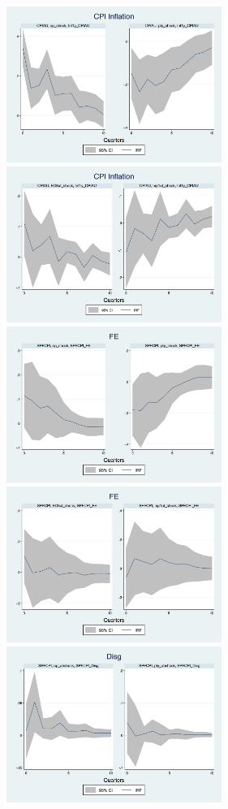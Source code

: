 \documentclass[]{article}
\begin{document}
\begin{figure}[ht]
	\centering
	\includegraphics[width=7cm,totalheight=3cm]{figures/CPIAU_ashocks_nmp_before2007.png}  
	\includegraphics[width=7cm,totalheight=3cm]{figures/CPIAU_ashocks_before2007.png} \\
	\smallskip
	\includegraphics[width=7cm,totalheight=3cm]{figures/SPFFE_ashocks_nmp_before2007.png} 
		\includegraphics[width=7cm,totalheight=3cm]{figures/SPFFE_ashocks_before2007.png} \\
	\smallskip
	\includegraphics[width=7cm,totalheight=3cm]{figures/SPFDisg_ab_ashocks_nmp_before2007.png} 

\end{figure}
\end{document}
